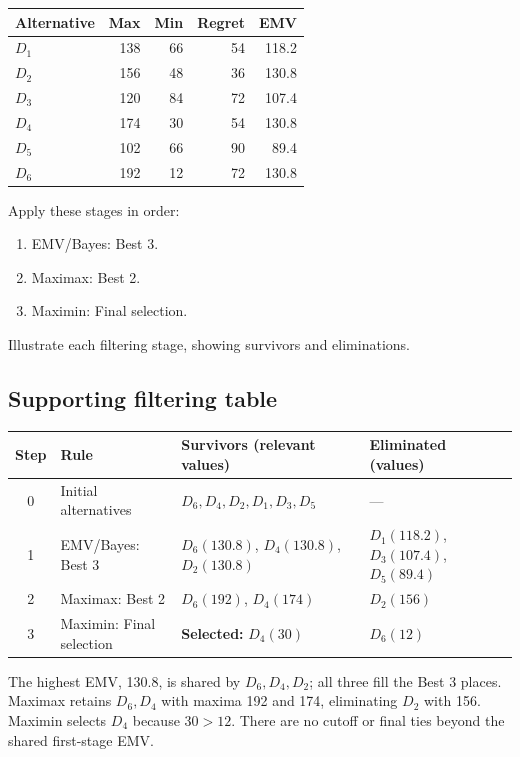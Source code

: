\vspace{-3mm}
\begin{center}\small\setlength{\tabcolsep}{4pt}
	\begin{tabular}{lrrrr}\toprule
		Alternative & Max & Min & Regret & EMV\\ \midrule
		$D_1$ & 138 & 66 & 54 & 118.2\\
		$D_2$ & 156 & 48 & 36 & 130.8\\
		$D_3$ & 120 & 84 & 72 & 107.4\\
		$D_4$ & 174 & 30 & 54 & 130.8\\
		$D_5$ & 102 & 66 & 90 & 89.4\\
		$D_6$ & 192 & 12 & 72 & 130.8\\
		\bottomrule
	\end{tabular}
\end{center}
\vspace{-3mm}

Apply these stages in order:
\begin{enumerate}[leftmargin=*]
	\item EMV/Bayes: Best 3.
	\item Maximax: Best 2.
	\item Maximin: Final selection.
\end{enumerate}
Illustrate each filtering stage, showing survivors and eliminations.
\label{sol:q3table}
\subsection*{Supporting filtering table}
\begin{center}\small
\begin{tabularx}{\textwidth}{@{}c >{\raggedright\arraybackslash}p{} >{\raggedright\arraybackslash}X >{\raggedright\arraybackslash}p{}@{}}
\toprule
Step & Rule & Survivors (relevant values) & Eliminated (values)\\\midrule
0 & Initial alternatives & $D_6,D_4,D_2,D_1,D_3,D_5$ & ---\\
1 & EMV/Bayes: Best 3 & $D_6(130.8)$, $D_4(130.8)$, $D_2(130.8)$ & $D_1(118.2)$, $D_3(107.4)$, $D_5(89.4)$\\
2 & Maximax: Best 2 & $D_6(192)$, $D_4(174)$ & $D_2(156)$\\
3 & Maximin: Final selection & \textbf{Selected:} $D_4(30)$ & $D_6(12)$\\
\bottomrule\end{tabularx}
\end{center}
The highest EMV, 130.8, is shared by $D_6,D_4,D_2$; all three fill the Best 3 places. Maximax retains $D_6,D_4$ with maxima 192 and 174, eliminating $D_2$ with 156. Maximin selects $D_4$ because $30>12$. There are no cutoff or final ties beyond the shared first-stage EMV.
\secInicio[sec:q3]
\clearpage
{}\label{sol:q3tree}
